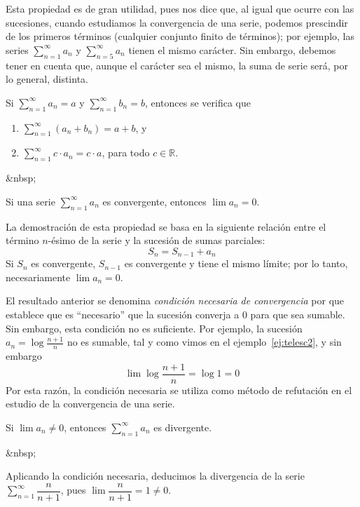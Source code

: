 Esta propiedad es de gran utilidad, pues nos dice que, al igual que ocurre con las sucesiones, cuando estudiamos la convergencia de una serie, podemos prescindir de los primeros términos (cualquier conjunto finito de términos);
por ejemplo, las series $\displaystyle\sum_{n=1}^\infty a_n$ y
$\displaystyle\sum_{n=5}^\infty a_n$ tienen el mismo carácter.
Sin embargo, debemos tener en cuenta que, aunque el carácter sea el mismo, la suma de serie será, por lo general, distinta.

\begin{teorema}\label{T-lineal} Si $\displaystyle\sum_{n=1}^\infty   a_n=a$ y $\displaystyle\sum_{n=1}^\infty   b_n=b$, entonces se verifica que 
\begin{enumerate}
\item $\displaystyle\sum_{n=1}^\infty   (a_n+b_n)=a+b$, y 
\item $\displaystyle\sum_{n=1}^\infty   c\cdot a_n=c\cdot a$, para todo $c\in\mathbb{R}$.
\end{enumerate}
\end{teorema}
\begin{rawhtml}
&nbsp;
\end{rawhtml}
\begin{teorema} Si una serie $\displaystyle\sum_{n=1}^\infty   a_n$
es convergente, entonces $\lim a_n=0$.
\end{teorema}

La demostración de esta propiedad se basa en la siguiente relación entre el término $n$-ésimo de la serie y la sucesión de sumas parciales:
\[
S_n = S_{n-1} + a_n
\]
Si $S_n$ es convergente, $S_{n-1}$ es convergente y tiene el mismo límite; por lo tanto, necesariamente $\lim a_n=0$.

El resultado anterior se denomina \emph{condición necesaria de convergencia} por que establece que es ``necesario'' que la sucesión converja a 0 para que sea sumable.
Sin embargo, esta condición no es suficiente.
Por ejemplo, la sucesión $a_n=\log\frac{n+1}n$ no es sumable, tal y como vimos en el ejemplo~\ref{ej:telesc2}, y sin embargo
\[
\lim\log\frac{n+1}n=\log 1 =0
\]
Por esta razón, la condición necesaria se utiliza como método de refutación en el estudio de la convergencia de una serie.
%
\begin{corolario}
Si $\lim a_n\neq 0$, entonces $\displaystyle\sum_{n=1}^\infty    a_n$ es divergente.
\end{corolario}
\begin{rawhtml}
&nbsp;
\end{rawhtml}
\begin{ejemplo}
Aplicando la condición necesaria, deducimos la divergencia de la serie $\displaystyle\sum_{n=1}^\infty  \dfrac{n}{n+1}$, pues $\lim\dfrac{n}{n+1}=1\ne0$. 
\fej\end{ejemplo}

